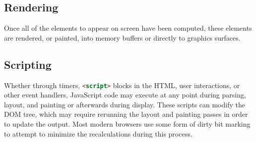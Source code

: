 \subsection{Rendering}

Once all of the elements to appear on screen have been computed, these elements are rendered, or painted, into memory buffers or
directly to graphics surfaces.

\subsection{Scripting}

Whether through timers, \lstinline[language=HTML]{<script>} blocks in the HTML, user interactions, or other event handlers,
JavaScript code may execute at any point during parsing, layout, and painting or afterwards during display.
These scripts can modify the DOM tree, which may require rerunning the layout and painting passes in order to update
the output.
Most modern browsers use some form of dirty bit marking to attempt to minimize the recalculations during this process.


